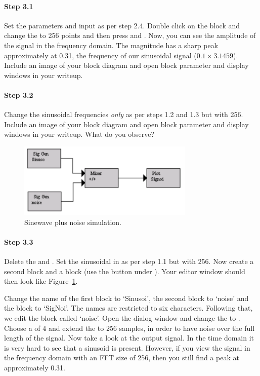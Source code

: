 \paragraph{Step 3.1} Set the  parameters and input as
per step 2.4. Double click on the  block and change the
 to 256 points and then press  and
. Now, you can see the amplitude of the signal in the
frequency domain. The magnitude has a sharp peak approximately at
0.31, the frequency of our sinusoidal signal ($0.1 \times
3.1459$). Include an image of your block diagram and open block
parameter and display windows in your writeup.

\paragraph{Step 3.2} Change the sinusoidal frequencies \emph{only} as
per steps 1.2 and 1.3 but with  256. Include an
image of your block diagram and open block parameter and display
windows in your writeup. What do you observe?


\begin{figure}
\begin{center}
\includegraphics[width=0.75\textwidth]{lab1/image024}
\end{center}
\caption{Sinewave plus noise simulation.\label{fg:sin-noise}}
\end{figure}

\paragraph{Step 3.3} Delete the  and . Set
the sinusoidal  in  as per step 1.1
but with  256. Now create a second 
block and a  block (use the  button under
). Your editor window should then look
like Figure~\ref{fg:sin-noise}.

Change the name of the first  block to `Sinusoi', the
second  block to `noise' and the  block to
`SigNoi'. The names are restricted to six characters. Following that,
we edit the  block called `noise'. Open the dialog
window and change the  to . Choose
a  of 4 and extend the  to 256
samples, in order to have noise over the full length of the
signal. Now take a look at the output signal. In the time domain it is
very hard to see that a sinusoid is present.  However, if you view the
signal in the frequency domain with an FFT size of 256, then you still
find a peak at approximately 0.31.

